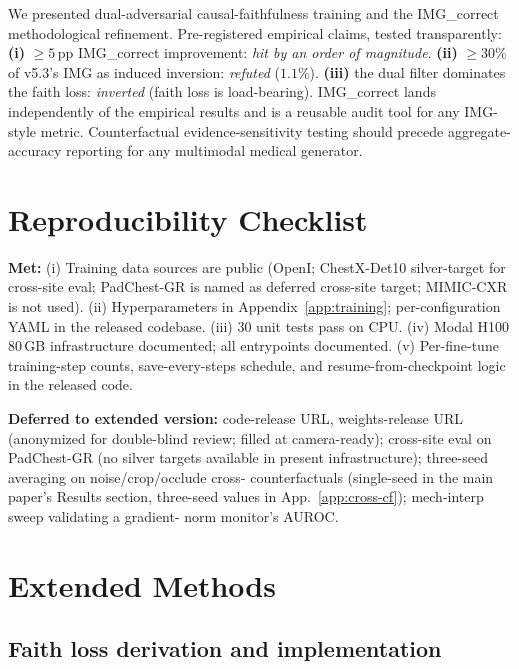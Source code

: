 \documentclass{article}
\begin{document}
We presented dual-adversarial causal-faithfulness training and the
IMG\_correct methodological refinement. Pre-registered empirical
claims, tested transparently: \textbf{(i)} $\geq 5$\,pp
IMG\_correct improvement: \emph{hit by an order of magnitude}.
\textbf{(ii)} $\geq 30\%$ of v5.3's IMG as induced inversion:
\emph{refuted} ($1.1\%$). \textbf{(iii)} the dual filter dominates
the faith loss: \emph{inverted} (faith loss is load-bearing).
IMG\_correct lands independently of the empirical results and is a
reusable audit tool for any IMG-style metric. Counterfactual
evidence-sensitivity testing should precede aggregate-accuracy
reporting for any multimodal medical generator.

\appendix
\onecolumn

\section{Reproducibility Checklist}
\label{app:repro}

\textbf{Met:} (i) Training data sources are public (OpenI; ChestX-Det10
silver-target for cross-site eval; PadChest-GR is named as deferred
cross-site target; MIMIC-CXR is not used). (ii) Hyperparameters in
Appendix~\ref{app:training}; per-configuration YAML in the released
codebase. (iii) $30$ unit tests pass on CPU. (iv) Modal H100 80\,GB
infrastructure documented; all entrypoints documented.
(v) Per-fine-tune training-step counts, save-every-steps schedule, and
resume-from-checkpoint logic in the released code.

\textbf{Deferred to extended version:} code-release URL, weights-release
URL (anonymized for double-blind review; filled at camera-ready);
cross-site eval on PadChest-GR (no silver targets available in present
infrastructure); three-seed averaging on noise/crop/occlude cross-
counterfactuals (single-seed in the main paper's Results section, three-seed values
in App.~\ref{app:cross-cf}); mech-interp sweep validating a gradient-
norm monitor's AUROC.

\section{Extended Methods}
\label{app:methods}

\subsection{Faith loss derivation and implementation}
\label{app:faith}
\end{document}
